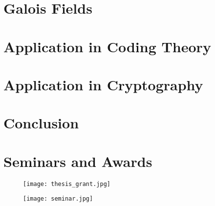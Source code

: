 \documentclass[a4paper,12pt,oneside,onecolumn,openany,final]{memoir}
\begin{document}
\chapter{Galois Fields}


\chapter{Application in Coding Theory}


\chapter{Application in Cryptography}


\chapter{Conclusion}



\backmatter


\chapter*{Seminars and Awards}
\begin{figure}[h]
  \texttt{[image: thesis\_grant.jpg]}
\end{figure}

\vspace{3mm}
\begin{figure}[h]
  \texttt{[image: seminar.jpg]}
\end{figure}
\end{document}
